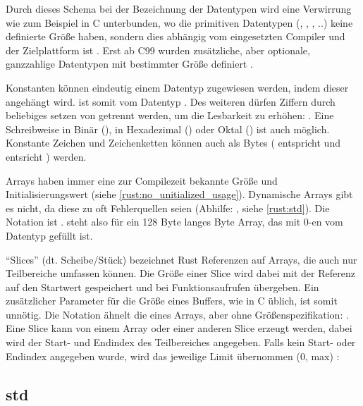 Durch dieses Schema bei der Bezeichnung der Datentypen wird eine Verwirrung wie zum Beispiel in C unterbunden, wo die primitiven Datentypen (, , , ..) keine definierte Größe haben, sondern dies abhängig vom eingesetzten Compiler und der Zielplattform ist \cite[187]{deitel2013c}. Erst ab C99 wurden zusätzliche, aber optionale, ganzzahlige Datentypen mit bestimmter Größe definiert \cite[141]{goll2014c}.

Konstanten können eindeutig einem Datentyp zugewiesen werden, indem dieser angehängt wird.
 ist somit vom Datentyp .
Des weiteren dürfen Ziffern durch beliebiges setzen von \rustcinline{_} getrennt werden, um die Lesbarkeit zu erhöhen: .
Eine Schreibweise in Binär (), in Hexadezimal () oder Oktal () ist auch möglich. 
Konstante Zeichen und Zeichenketten können auch als Bytes ( entspricht  und  entsricht \rustcinline{&[u8]})  werden.

Arrays haben immer eine zur Compilezeit bekannte Größe und Initialisierungswert (siehe \autoref{rust:no_unitialized_usage}).
Dynamische Arrays gibt es nicht, da diese zu oft Fehlerquellen seien  (Abhilfe: , siehe \autoref{rust:std}).
Die Notation ist .
\rustcinline{[0_u8; 128]} steht also für ein 128 Byte langes Byte Array, das mit 0-en vom Datentyp  gefüllt ist.

\enquote{Slices} (dt. Scheibe/Stück) bezeichnet Rust Referenzen auf Arrays, die auch nur Teilbereiche umfassen können.
Die Größe einer Slice wird dabei mit der Referenz auf den Startwert gespeichert  und bei Funktionsaufrufen übergeben.
Ein zusätzlicher Parameter für die Größe eines Buffers, wie in C üblich, ist somit unnötig.
Die Notation ähnelt die eines Arrays, aber ohne Größenspezifikation: \rustcinline{[<Datentyp>]}.
Eine Slice kann von einem Array oder einer anderen Slice erzeugt werden, dabei wird der Start- und Endindex des Teilbereiches angegeben.
Falls kein Start- oder Endindex angegeben wurde, wird das jeweilige Limit übernommen (0, max) : 


\subsection{std}
\label{rust:std}


